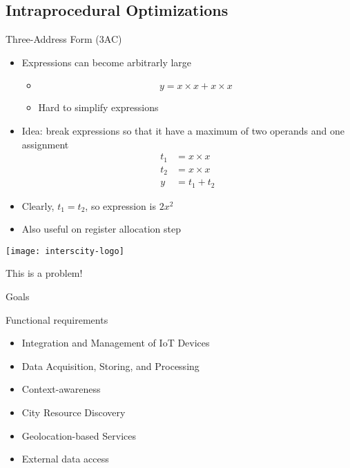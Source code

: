 \subsection{Intraprocedural Optimizations}
\begin{frame}{Three-Address Form (3AC)}
\begin{itemize}
    \item Expressions can become arbitrarly large \vspace*{-0.5cm}
    \begin{itemize}
        \item[] $$y = x \times x + x \times x$$ \vspace*{-0.3cm}
        \item Hard to simplify expressions
    \end{itemize}
    \item Idea: break expressions so that it have a maximum of two operands
    and one assignment \vspace*{-0.3cm}
    \begin{align}
          t_1 &= x \times x \nonumber \\
          t_2 &= x \times x \nonumber \\
            y &= t_1 + t_2 \nonumber
    \end{align} \vspace*{-0.6cm}
    \item Clearly, $t_1 = t_2$, so expression is $2x^2$
    \item Also useful on register allocation step
\end{itemize}

\end{frame}

\begin{frame}[plain]
  \texttt{[image: interscity-logo]}
\end{frame}

\begin{frame}[standout]
  This is a problem!
\end{frame}

\begin{frame}{Goals}
  \begin{block}{Functional requirements}
    \begin{itemize}
      \item Integration and Management of \alert{IoT} Devices
      \item Data Acquisition, Storing, and Processing
      \item Context-awareness
      \item City Resource Discovery
      \item Geolocation-based Services
      \item External data access
    \end{itemize}
  \end{block}
\end{frame}

